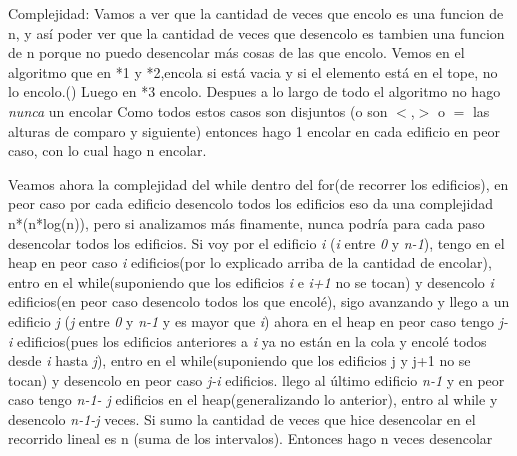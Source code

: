 \documentclass{article}
\begin{document}
\newpage

{\noindent \Huge Complejidad:}
\newline \newline
Vamos a ver que la cantidad de veces que encolo es una funcion de n, y así poder ver que la cantidad de veces que desencolo es tambien una funcion de n porque no puedo desencolar más cosas de las que encolo.
Vemos en el algoritmo que en  *1 y *2,encola si está vacia y si el elemento está en el tope, no lo encolo.(\color{red}{falta demostrar que si quiero encolar un elemento 2 veces el que quiero encolar de nuevo está en el tope, la idea la había sacado angel})\color{black} Luego en *3 encolo. Despues a lo largo de todo el algoritmo no hago \textit{nunca} un encolar
Como todos estos casos son disjuntos (o son $<$,$>$ o $=$ las alturas de comparo y siguiente) entonces hago 1 encolar en cada edificio en peor caso, con lo cual hago n encolar. 
\newline

Veamos ahora la complejidad del while dentro del for(de recorrer los edificios), en peor caso por cada edificio desencolo todos los edificios eso da una complejidad n*(n*log(n)), pero si analizamos más finamente, nunca podría para cada paso desencolar todos los edificios.\newline
Si voy por el edificio \textit{i} (\textit{i} entre \textit{0} y \textit{n-1}), tengo en el heap en peor caso \textit{i} edificios(por lo explicado arriba de la cantidad de encolar), entro en el while(suponiendo que los edificios \textit{i} e \textit{i+1} no se tocan) y desencolo \textit{i} edificios(en peor caso desencolo todos los que encolé), sigo avanzando y llego a un edificio \textit{j} (\textit{j} entre \textit{0} y \textit{n-1} y es mayor que \textit{i}) ahora en el heap en peor caso tengo \textit{j-i} edificios(pues los edificios anteriores a \textit{i} ya no están en la cola y encolé todos desde \textit{i} hasta \textit{j}), entro en el while(suponiendo que los edificios j y j+1 no se tocan) y desencolo en peor caso \textit{j-i} edificios.
llego al último edificio \textit{n-1} y en peor caso tengo \textit{n-1- j} edificios en el heap(generalizando lo anterior), entro al while y desencolo \textit{n-1-j} veces.
Si sumo la cantidad de veces que hice desencolar en el recorrido lineal es n (suma de los intervalos).
Entonces hago n veces desencolar
\end{document}
